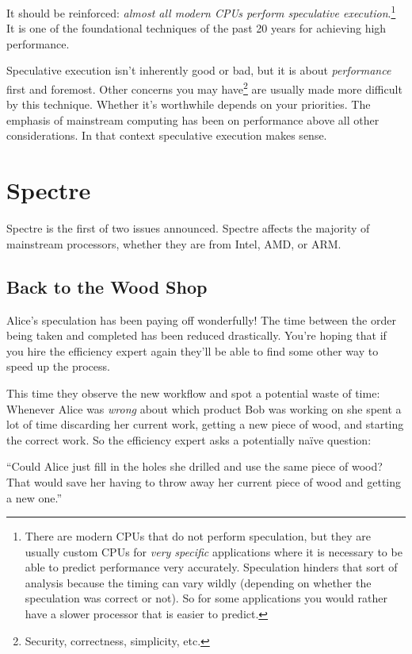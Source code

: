 \documentclass{article}
\begin{document}
It should be reinforced: \emph{almost all modern CPUs perform speculative
execution}.\footnote{There are modern CPUs that do not perform speculation, but
they are usually custom CPUs for \emph{very specific} applications where it is
necessary to be able to predict performance very accurately. Speculation
hinders that sort of analysis because the timing can vary wildly (depending on
whether the speculation was correct or not). So for some applications you would
rather have a slower processor that is easier to predict.} It is one of the
foundational techniques of the past 20 years for achieving high performance.

Speculative execution isn't inherently good or bad, but it is about
\emph{performance} first and foremost. Other concerns you may
have\footnote{Security, correctness, simplicity, etc.} are usually made more
difficult by this technique. Whether it's worthwhile depends on your
priorities. The emphasis of mainstream computing has been on performance above
all other considerations. In that context speculative execution makes sense.

\section{Spectre}

Spectre is the first of two issues announced. Spectre affects the majority of
mainstream processors, whether they are from Intel, AMD, or ARM.

\subsection*{Back to the Wood Shop}

Alice's speculation has been paying off wonderfully! The time between the order
being taken and completed has been reduced drastically. You're hoping that if
you hire the efficiency expert again they'll be able to find some other way to
speed up the process.

This time they observe the new workflow and spot a potential waste of time:
Whenever Alice was \emph{wrong} about which product Bob was working on she
spent a lot of time discarding her current work, getting a new piece of wood,
and starting the correct work. So the efficiency expert asks a potentially
na\"{i}ve question:

``Could Alice just fill in the holes she drilled and use the same piece of
wood? That would save her having to throw away her current piece of wood and
getting a new one.''
\end{document}
